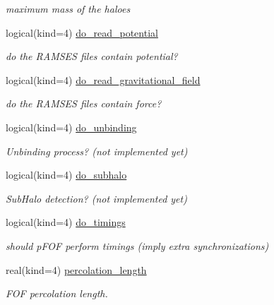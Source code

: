 \begin{DoxyCompactItemize}
\begin{DoxyCompactList}\small\item\em maximum mass of the haloes \end{DoxyCompactList}\item 
logical(kind=4) \hyperlink{structmodconstant_1_1type__parameter__pfof_aba812b01af16a40aa26a33136619786a}{do\-\_\-read\-\_\-potential}
\begin{DoxyCompactList}\small\item\em do the R\-A\-M\-S\-E\-S files contain potential? \end{DoxyCompactList}\item 
logical(kind=4) \hyperlink{structmodconstant_1_1type__parameter__pfof_aa8c19ebe7cca7545effc17c2162557cb}{do\-\_\-read\-\_\-gravitational\-\_\-field}
\begin{DoxyCompactList}\small\item\em do the R\-A\-M\-S\-E\-S files contain force? \end{DoxyCompactList}\item 
logical(kind=4) \hyperlink{structmodconstant_1_1type__parameter__pfof_a4d8097905d8490a45d84b471ae1f5bb8}{do\-\_\-unbinding}
\begin{DoxyCompactList}\small\item\em Unbinding process? (not implemented yet) \end{DoxyCompactList}\item 
logical(kind=4) \hyperlink{structmodconstant_1_1type__parameter__pfof_a9f6178ca41c0ae971922f15f5399b2b5}{do\-\_\-subhalo}
\begin{DoxyCompactList}\small\item\em Sub\-Halo detection? (not implemented yet) \end{DoxyCompactList}\item 
logical(kind=4) \hyperlink{structmodconstant_1_1type__parameter__pfof_af646b4ae96b024905287fdb0b75305da}{do\-\_\-timings}
\begin{DoxyCompactList}\small\item\em should p\-F\-O\-F perform timings (imply extra synchronizations) \end{DoxyCompactList}\item 
real(kind=4) \hyperlink{structmodconstant_1_1type__parameter__pfof_aa62ddf1e2fd4d2d5d5f6fb9381268784}{percolation\-\_\-length}
\begin{DoxyCompactList}\small\item\em F\-O\-F percolation length. \end{DoxyCompactList}\end{DoxyCompactItemize}



